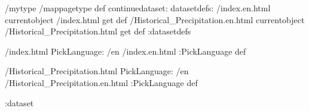 \begin{ingrid}
/mytype /mappagetype def
continuedataset:
datasetdefs:
/index.en.html currentobject /index.html get def
/Historical_Precipitation.en.html currentobject /Historical_Precipitation.html get def
:datasetdefs

/index.html {
PickLanguage:
/en /index.en.html
:PickLanguage
} def

/Historical_Precipitation.html {
PickLanguage:
/en /Historical_Precipitation.en.html
:PickLanguage
} def



:dataset
\end{ingrid}
